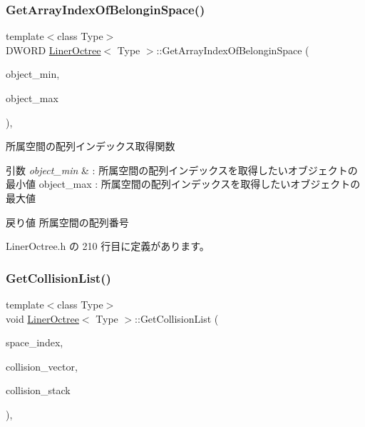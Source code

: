 \subsubsection{\texorpdfstring{Get\+Array\+Index\+Of\+Belongin\+Space()}{GetArrayIndexOfBelonginSpace()}}
{\footnotesize\ttfamily template$<$class Type$>$ \\
D\+W\+O\+RD \mbox{\hyperlink{class_liner_octree}{Liner\+Octree}}$<$ Type $>$\+::Get\+Array\+Index\+Of\+Belongin\+Space (\begin{DoxyParamCaption}\item[{const \mbox{\hyperlink{_vector3_d_8h_ab16f59e4393f29a01ec8b9bbbabbe65d}{Vec3}} $\ast$}]{object\+\_\+min,  }\item[{const \mbox{\hyperlink{_vector3_d_8h_ab16f59e4393f29a01ec8b9bbbabbe65d}{Vec3}} $\ast$}]{object\+\_\+max }\end{DoxyParamCaption})\hspace{0.3cm}{\ttfamily [inline]}, {\ttfamily [private]}}



所属空間の配列インデックス取得関数 


\begin{DoxyParams}{引数}
{\em object\+\_\+min} & \+: 所属空間の配列インデックスを取得したいオブジェクトの最小値 object\+\_\+max \+: 所属空間の配列インデックスを取得したいオブジェクトの最大値 \\
\hline
\end{DoxyParams}
\begin{DoxyReturn}{戻り値}
所属空間の配列番号 
\end{DoxyReturn}


 Liner\+Octree.\+h の 210 行目に定義があります。

\mbox{\label{class_liner_octree_ac74ebba8b5f12fa94745a899b222e2b6}} 
\subsubsection{\texorpdfstring{Get\+Collision\+List()}{GetCollisionList()}}
{\footnotesize\ttfamily template$<$class Type$>$ \\
void \mbox{\hyperlink{class_liner_octree}{Liner\+Octree}}$<$ Type $>$\+::Get\+Collision\+List (\begin{DoxyParamCaption}\item[{D\+W\+O\+RD}]{space\+\_\+index,  }\item[{std\+::vector$<$ Type $>$ $\ast$}]{collision\+\_\+vector,  }\item[{std\+::list$<$ Type $>$ $\ast$}]{collision\+\_\+stack }\end{DoxyParamCaption})\hspace{0.3cm}{\ttfamily [inline]}, {\ttfamily [private]}}



